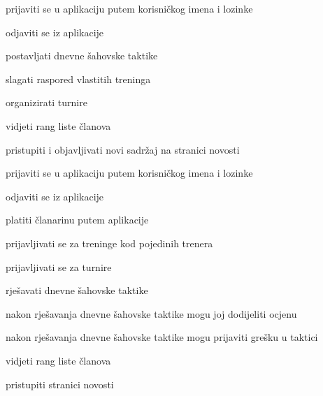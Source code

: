 			
			\begin{packed_enum}
				\item  {}
				
				\begin{packed_enum}
					
					\item prijaviti se u aplikaciju putem korisničkog imena i lozinke
					\item odjaviti se iz aplikacije
					\item postavljati dnevne šahovske taktike
					\item slagati raspored vlastitih treninga
					\item organizirati turnire
					\item vidjeti rang liste članova
					\item pristupiti i objavljivati novi sadržaj na stranici novosti 
					
				\end{packed_enum}
			
				\item  {}
				
				\begin{packed_enum}
					
					\item prijaviti se u aplikaciju putem korisničkog imena i lozinke
					\item odjaviti se iz aplikacije
					\item platiti članarinu putem aplikacije
					\item prijavljivati se za treninge kod pojedinih trenera
					\item prijavljivati se za turnire
					\item rješavati dnevne šahovske taktike
					\begin{packed_enum}
						
						\item nakon rješavanja dnevne šahovske taktike mogu joj dodijeliti ocjenu
						\item nakon rješavanja dnevne šahovske taktike mogu prijaviti grešku u taktici
						
					\end{packed_enum}
					\item vidjeti rang liste članova
					\item pristupiti stranici novosti
					
				\end{packed_enum}
			

\end{packed_enum}
